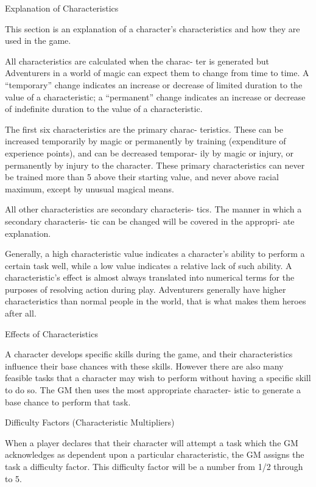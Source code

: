 \begin{Chapter}{Explanation of Characteristics}

This  section  is  an  explanation  of  a  character’s 
characteristics and how they are used in the game. 

All  characteristics  are  calculated  when  the  charac-
ter  is  generated  but  Adventurers  in  a  world  of 
magic  can  expect  them  to  change  from  time  to 
time.  A  “temporary”  change  indicates  an  increase 
or  decrease  of  limited  duration  to  the  value  of  a 
characteristic;  a  “permanent”  change  indicates  an 
increase  or  decrease  of  indefinite  duration  to  the 
value of a characteristic. 

The first six characteristics are the primary charac-
teristics.  These  can  be  increased  temporarily  by 
magic  or  permanently  by  training  (expenditure  of 
experience points), and can be decreased temporar-
ily by magic or injury, or permanently by injury to 
the  character.  These  primary  characteristics  can 
never  be  trained  more  than  5  above  their  starting 
value, and never above racial maximum, except by 
unusual magical means. 

All other characteristics are secondary characteris-
tics. The manner in which a secondary characteris-
tic can be changed will be covered in the appropri-
ate explanation. 

Generally,  a  high  characteristic  value  indicates  a 
character’s  ability  to  perform  a  certain  task  well, 
while a  low value indicates a relative lack of such 
ability.  A  characteristic’s  effect  is  almost  always 
translated into numerical terms for the purposes of 
resolving action during play. Adventurers generally 
have  higher  characteristics  than  normal  people  in 
the world, that is what makes them heroes after all. 

Effects of Characteristics 

A  character  develops  specific  skills  during  the 
game, and their characteristics influence their base 
chances  with  these  skills.  However  there  are  also 
many  feasible  tasks  that  a  character  may  wish  to 
perform  without  having  a  specific  skill  to  do  so. 
The  GM then uses the most appropriate character-
istic to generate a base chance to perform that task. 

Difficulty Factors (Characteristic Multipliers) 

When  a  player  declares  that  their  character  will 
attempt  a  task  which  the  GM  acknowledges  as 
dependent upon a particular characteristic, the GM 
assigns  the  task  a  difficulty  factor.  This  difficulty 
factor will be a number from 1/2 through to 5. 


\end{Chapter}

